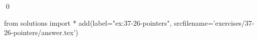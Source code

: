 
\begin{ex}
  \label{ex:37-26-pointers}
  
  \qed
\end{ex}
\begin{python0}
from solutions import *
add(label="ex:37-26-pointers",
    srcfilename='exercises/37-26-pointers/answer.tex')
\end{python0}
